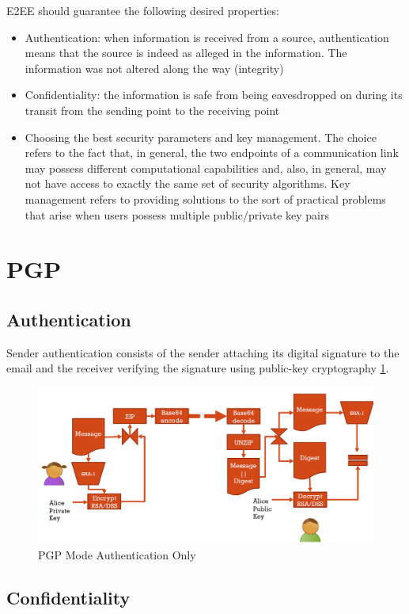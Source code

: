E2EE should guarantee the following desired properties:
\begin{itemize}
	\item Authentication: when information is received from a source, authentication means that the source is indeed as alleged in the information. The information was not altered along the way (integrity)
	\item Confidentiality: the information is safe from being eavesdropped on during its transit from the sending point to the receiving point
	\item Choosing the best security parameters and key management. The choice refers to the fact that, in general, the two endpoints of a communication link may possess different computational capabilities and, also, in general, may not have access to exactly the same set of security algorithms. Key management refers to providing solutions to the sort of practical problems that arise when users possess multiple public/private key pairs
\end{itemize}

\section{PGP}

\subsection{Authentication}
Sender authentication consists of the sender attaching its digital signature to the email and the receiver verifying the signature using public-key cryptography \ref{fig:gpg-authentication}.

\begin{figure}
	\centering
	\includegraphics[width=0.7\linewidth]{Images/Chapter7/pgp-authentication}
	\caption{PGP Mode Authentication Only}
	\label{fig:gpg-authentication}
\end{figure}

\subsection{Confidentiality}


